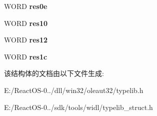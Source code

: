 \begin{DoxyCompactItemize}
\mbox{\label{struct_s_l_t_g___type_info_tail_aea67fec941c30e1c5de8e4c387ca235e}} 
W\+O\+RD {\bfseries res0e}
\item 
\mbox{\label{struct_s_l_t_g___type_info_tail_a0f758ac4a000752f2754905e803cb5de}} 
W\+O\+RD {\bfseries res10}
\item 
\mbox{\label{struct_s_l_t_g___type_info_tail_a8bf0da73723967a7488f36f5f8d276e4}} 
W\+O\+RD {\bfseries res12}
\item 
\mbox{\label{struct_s_l_t_g___type_info_tail_aff5258623932ad0b076711b067b487ad}} 
W\+O\+RD {\bfseries res1c}
\end{DoxyCompactItemize}


该结构体的文档由以下文件生成\+:\begin{DoxyCompactItemize}
\item 
E\+:/\+React\+O\+S-\/0../dll/win32/oleaut32/typelib.\+h\item 
E\+:/\+React\+O\+S-\/0../sdk/tools/widl/typelib\+\_\+struct.\+h\end{DoxyCompactItemize}
